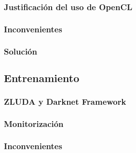 \subsubsection{Justificación del uso de OpenCL}
\subsubsection{Inconvenientes}
\subsubsection{Solución}


\subsection{Entrenamiento}
\subsubsection{ZLUDA y Darknet Framework}
\subsubsection{Monitorización}
\subsubsection{Inconvenientes}

